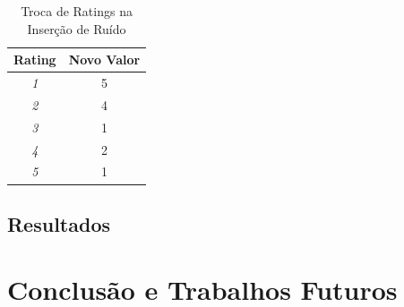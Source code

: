 \documentclass{sig-alternate}
\begin{document}
\begin{table}[h!]
	\centering
	\label{my-label}
	\begin{tabular}{|c|c|}
		\hline
		\textbf{Rating} & \textbf{Novo Valor} \\ \hline
		\textit{1}      & 5                   \\ \hline
		\textit{2}      & 4                   \\ \hline
		\textit{3}      & 1                   \\ \hline
		\textit{4}      & 2                   \\ \hline
		\textit{5}      & 1                   \\ \hline
	\end{tabular}
	\caption{Troca de Ratings na Inserção de Ruído}
\end{table}


\subsection{Resultados}

\section{Conclusão e Trabalhos Futuros}
\end{document}
